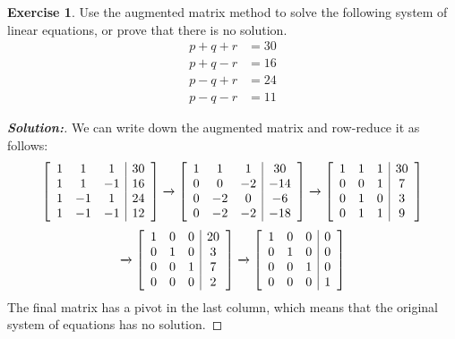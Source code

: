 \documentclass[a4paper]{amsart}
\theoremstyle{definition}
\newtheorem{exercise}{Exercise}
\newenvironment{solution}{\begin{proof}[\textbf{Solution:}] \vphantom{u}}{\end{proof}}
\begin{document}
\begin{exercise}\label{ex-solve-iii}
 Use the augmented matrix method to solve the following system of
 linear equations, or prove that there is no solution.
 \begin{align*}
  p+q+r &= 30 \\
  p+q-r &= 16 \\
  p-q+r &= 24 \\
  p-q-r &= 11
 \end{align*}
\end{exercise}
\begin{solution}
 We can write down the augmented matrix and row-reduce it as follows:
 \[ 
  \left[\begin{array}{ccc|c}
    1 &  1 &  1 & 30 \\
    1 &  1 & -1 & 16 \\
    1 & -1 &  1 & 24 \\
    1 & -1 & -1 & 12
  \end{array}\right]
  \xrightarrow{}
  \left[\begin{array}{ccc|c}
    1 &  1 &  1 &  30 \\
    0 &  0 & -2 & -14 \\
    0 & -2 &  0 &  -6 \\
    0 & -2 & -2 & -18
  \end{array}\right]
  \xrightarrow{}
  \left[\begin{array}{ccc|c}
    1 &  1 &  1 &  30 \\
    0 &  0 &  1 &   7 \\
    0 &  1 &  0 &   3 \\
    0 &  1 &  1 &   9
  \end{array}\right]
 \] \[
  \xrightarrow{}
  \left[\begin{array}{ccc|c}
    1 &  0 &  0 &  20 \\
    0 &  1 &  0 &   3 \\
    0 &  0 &  1 &   7 \\
    0 &  0 &  0 &   2
  \end{array}\right]
  \xrightarrow{}
  \left[\begin{array}{ccc|c}
    1 &  0 &  0 &  0 \\
    0 &  1 &  0 &  0 \\
    0 &  0 &  1 &  0 \\
    0 &  0 &  0 &  1
  \end{array}\right]
 \]
 The final matrix has a pivot in the last column, which means that the
 original system of equations has no solution.
\end{solution}
\end{document}
